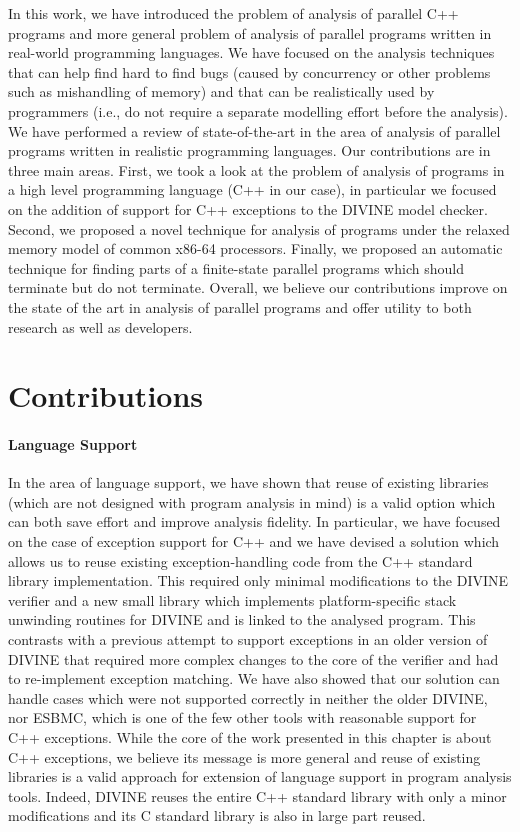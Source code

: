 In this work, we have introduced the problem of analysis of parallel C++ programs and more general problem of analysis of parallel programs written in real-world programming languages.
We have focused on the analysis techniques that can help find hard to find bugs (caused by concurrency or other problems such as mishandling of memory) and that can be realistically used by programmers (i.e., do not require a separate modelling effort before the analysis).
We have performed a review of state-of-the-art in the area of analysis of parallel programs written in realistic programming languages.
Our contributions are in three main areas.
First, we took a look at the problem of analysis of programs in a high level programming language (C++ in our case), in particular we focused on the addition of support for C++ exceptions to the DIVINE model checker.
Second, we proposed a novel technique for analysis of programs under the relaxed memory model of common x86-64 processors.
Finally, we proposed an automatic technique for finding parts of a finite-state parallel programs which should terminate but do not terminate.
Overall, we believe our contributions improve on the state of the art in analysis of parallel programs and offer utility to both research as well as developers.

\section{Contributions}

\paragraph{Language Support}

In the area of language support, we have shown that reuse of existing libraries (which are not designed with program analysis in mind) is a valid option which can both save effort and improve analysis fidelity.
In particular, we have focused on the case of exception support for C++ and we have devised a solution which allows us to reuse existing exception-handling code from the C++ standard library implementation.
This required only minimal modifications to the DIVINE verifier and a new small library which implements platform-specific stack unwinding routines for DIVINE and is linked to the analysed program.
This contrasts with a previous attempt to support exceptions in an older version of DIVINE that required more complex changes to the core of the verifier and had to re-implement exception matching.
We have also showed that our solution can handle cases which were not supported correctly in neither the older DIVINE, nor ESBMC, which is one of the few other tools with reasonable support for C++ exceptions.
While the core of the work presented in this chapter is about C++ exceptions, we believe its message is more general and reuse of existing libraries is a valid approach for extension of language support in program analysis tools.
Indeed, DIVINE reuses the entire C++ standard library with only a minor modifications and its C standard library is also in large part reused.

